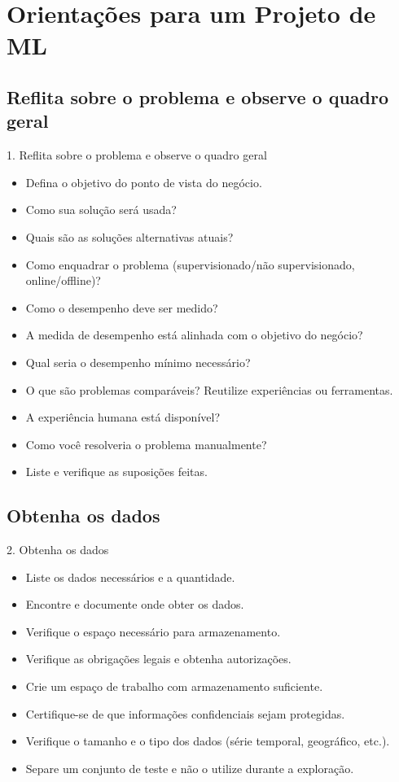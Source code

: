 \documentclass{beamer}
\begin{document}
\section{Orientações para um Projeto de ML}

\subsection{Reflita sobre o problema e observe o quadro geral}
\begin{frame}{1. Reflita sobre o problema e observe o quadro geral}
    \begin{itemize}
        \item Defina o objetivo do ponto de vista do negócio.
        \item Como sua solução será usada?
        \item Quais são as soluções alternativas atuais?
        \item Como enquadrar o problema (supervisionado/não supervisionado, online/offline)?
        \item Como o desempenho deve ser medido?
        \item A medida de desempenho está alinhada com o objetivo do negócio?
        \item Qual seria o desempenho mínimo necessário?
        \item O que são problemas comparáveis? Reutilize experiências ou ferramentas.
        \item A experiência humana está disponível?
        \item Como você resolveria o problema manualmente?
        \item Liste e verifique as suposições feitas.
    \end{itemize}
\end{frame}

\subsection{Obtenha os dados}
\begin{frame}{2. Obtenha os dados}
    \begin{itemize}
        \item Liste os dados necessários e a quantidade.
        \item Encontre e documente onde obter os dados.
        \item Verifique o espaço necessário para armazenamento.
        \item Verifique as obrigações legais e obtenha autorizações.
        \item Crie um espaço de trabalho com armazenamento suficiente.
        \item Certifique-se de que informações confidenciais sejam protegidas.
        \item Verifique o tamanho e o tipo dos dados (série temporal, geográfico, etc.).
        \item Separe um conjunto de teste e não o utilize durante a exploração.
    \end{itemize}
\end{frame}
\end{document}
